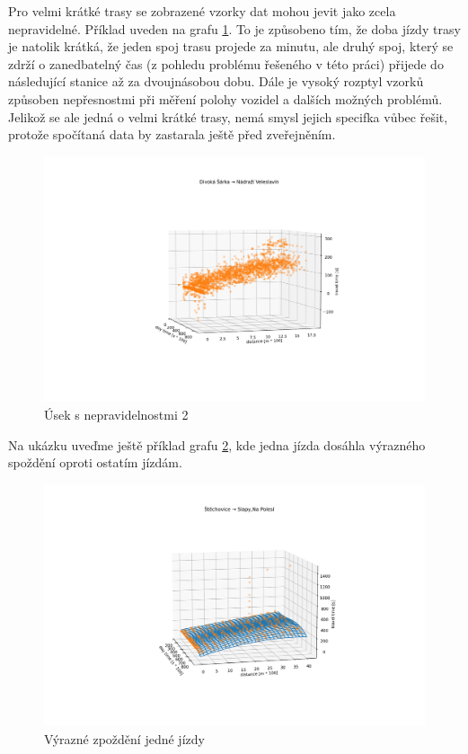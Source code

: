 Pro velmi krátké trasy se zobrazené vzorky dat mohou jevit jako zcela nepravidelné. Příklad uveden na grafu \ref{fig:divoka_sarka_veleslavin}. To je způsobeno tím, že doba jízdy trasy je natolik krátká, že jeden spoj trasu projede za minutu, ale druhý spoj, který se zdrží o zanedbatelný čas (z pohledu problému řešeného v této práci) přijede do následující stanice až za dvoujnásobou dobu. Dále je vysoký rozptyl vzorků způsoben nepřesnostmi při měření polohy vozidel a dalších možných problémů. Jelikož se ale jedná o velmi krátké trasy, nemá smysl jejich specifka vůbec řešit, protože spočítaná data by zastarala ještě před zveřejněním.

\begin{figure}
	\centering
  \includegraphics[width=\linewidth]{../img/divoka_sarka_veleslavin.png}
  \caption{Úsek s nepravidelnostmi 2}
  \label{fig:divoka_sarka_veleslavin}
\end{figure}

Na ukázku uveďme ještě příklad grafu \ref{fig:delayed_trip}, kde jedna jízda dosáhla výrazného spoždění oproti ostatím jízdám.

\begin{figure}
	\centering
  \includegraphics[width=\linewidth]{../img/delayed_trip.png}
  \caption{Výrazné zpoždění jedné jízdy}
  \label{fig:delayed_trip}
\end{figure}

